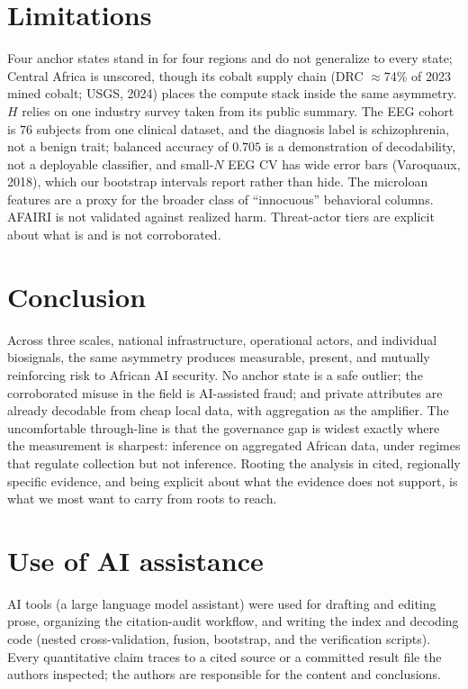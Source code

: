 \documentclass{article}
\begin{document}
\section{Limitations}
Four anchor states stand in for four regions and do not generalize to every state; Central Africa is unscored,
though its cobalt supply chain (DRC $\approx$74\% of 2023 mined cobalt; USGS, 2024) places the compute stack
inside the same asymmetry. $H$ relies on one industry survey taken from its public summary. The EEG cohort is
$76$ subjects from one clinical dataset, and the diagnosis label is schizophrenia, not a benign trait; balanced
accuracy of $0.705$ is a demonstration of decodability, not a deployable classifier, and small-$N$ EEG CV has
wide error bars (Varoquaux, 2018), which our bootstrap intervals report rather than hide. The microloan features
are a proxy for the broader class of ``innocuous'' behavioral columns. AFAIRI is not validated against realized
harm. Threat-actor tiers are explicit about what is and is not corroborated.

\section{Conclusion}
Across three scales, national infrastructure, operational actors, and individual biosignals, the same asymmetry
produces measurable, present, and mutually reinforcing risk to African AI security. No anchor state is a safe
outlier; the corroborated misuse in the field is AI-assisted fraud; and private attributes are already decodable
from cheap local data, with aggregation as the amplifier. The uncomfortable through-line is that the governance
gap is widest exactly where the measurement is sharpest: inference on aggregated African data, under regimes that
regulate collection but not inference. Rooting the analysis in cited, regionally specific evidence, and being
explicit about what the evidence does not support, is what we most want to carry from roots to reach.

\section*{Use of AI assistance}
AI tools (a large language model assistant) were used for drafting and editing prose, organizing the
citation-audit workflow, and writing the index and decoding code (nested cross-validation, fusion, bootstrap, and
the verification scripts). Every quantitative claim traces to a cited source or a committed result file the
authors inspected; the authors are responsible for the content and conclusions.


\end{document}
